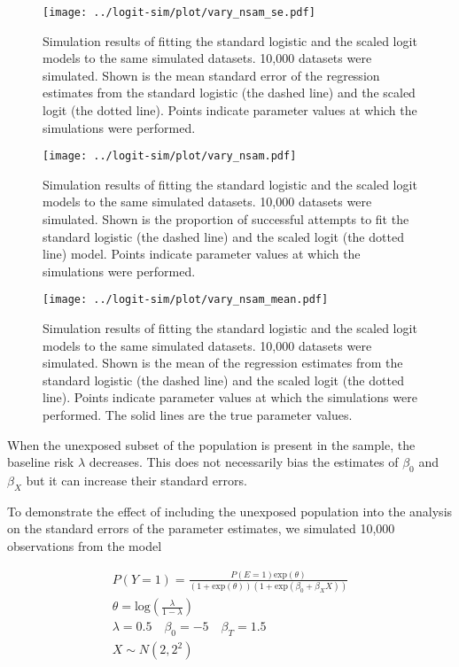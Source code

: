 \begin{figure}[htp]
	\centering
	\texttt{[image: ../logit-sim/plot/vary\_nsam\_se.pdf]}
	\caption{
		Simulation results of fitting the standard logistic and the scaled logit models to the same simulated datasets. 10,000 datasets were simulated. Shown is the mean standard error of the regression estimates from the standard logistic (the dashed line) and the scaled logit (the dotted line). Points indicate parameter values at which the simulations were performed.
	}
	\label{SclrSE}
\end{figure}

\begin{figure}[htp]
	\centering
	\texttt{[image: ../logit-sim/plot/vary\_nsam.pdf]}
	\caption{
		Simulation results of fitting the standard logistic and the scaled logit models to the same simulated datasets. 10,000 datasets were simulated. Shown is the proportion of successful attempts to fit the standard logistic (the dashed line) and the scaled logit (the dotted line) model. Points indicate parameter values at which the simulations were performed.
	}
	\label{SclrConv}
\end{figure}

\begin{figure}[htp]
	\centering
	\texttt{[image: ../logit-sim/plot/vary\_nsam\_mean.pdf]}
	\caption{
		Simulation results of fitting the standard logistic and the scaled logit models to the same simulated datasets. 10,000 datasets were simulated. Shown is the mean of the regression estimates from the standard logistic (the dashed line) and the scaled logit (the dotted line). Points indicate parameter values at which the simulations were performed. The solid lines are the true parameter values.
	}
	\label{SclrMean}
\end{figure}

When the unexposed subset of the population is present in the sample, the baseline risk $\lambda$ decreases. This does not necessarily bias the estimates of $\beta_0$ and $\beta_X$ but it can increase their standard errors.

To demonstrate the effect of including the unexposed population into the analysis on the standard errors of the parameter estimates, we simulated 10,000 observations from the model

\[
	\begin{gathered}
		P(Y=1) = \frac{P(E=1)\text{exp}(\theta)}{(1+\text{exp}(\theta))(1+\text{exp}(\beta_0+\beta_X X))} \\
		\theta = \text{log}(\frac{\lambda}{1-\lambda}) \\
		\lambda = 0.5 \quad \beta_0 = -5 \quad \beta_T = 1.5 \\
		X \sim N(2, 2^2)
	\end{gathered}
\]


